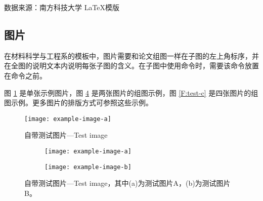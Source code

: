 \begin{table}[htb]
    \renewcommand{\arraystretch}{1.5} %
    \centering
    \caption{带表注的表格的标题}
    \label{table2}
    \begin{threeparttable}
        \begin{tablenotes}
            \item[1] 数据来源：南方科技大学 \LaTeX 模版 %
        \end{tablenotes}
    \end{threeparttable}
\end{table}

\subsection{图片}

在材料科学与工程系的模板中，图片需要和论文组图一样在子图的左上角标序，并在全图的说明文本内说明每张子图的含义。在子图中使用\verbbox{\caption}命令时，需要该命令放置在命令之前。

图 \ref{F:test-a} 是单张示例图片，图 \ref{F:test-b} 是两张图片的组图示例，图 \ref{F:test-c} 是四张图片的组图示例。更多图片的排版方式可参照这些示例。

\clearpage

\begin{figure}[htb]
    \centering
    \texttt{[image: example-image-a]}
    \caption{自带测试图片---Test image}\label{F:test-a}
\end{figure}

\begin{figure}[htb]
    \centering
    \begin{subfigure}[t]{.45\linewidth}
        \centering
        \caption{}\label{F:test-b-sub-a}
        \texttt{[image: example-image-a]}
    \end{subfigure}
    \hfill %
    \begin{subfigure}[t]{.45\linewidth}
        \centering
        \caption{}\label{F:test-b-sub-b}
        \texttt{[image: example-image-b]}
    \end{subfigure}
    \caption{自带测试图片---Test image，其中(a)为测试图片A，(b)为测试图片B。}\label{F:test-b}
\end{figure}


